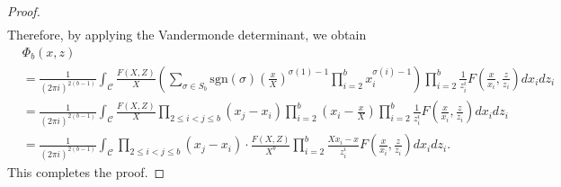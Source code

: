 \documentclass[12pt]{amsart}%
\theoremstyle{definition}
\begin{document}
\begin{proof}
\begin{align*}
\end{align*}
Therefore, by applying the Vandermonde determinant, we obtain
\begin{align*}
&\Phi_b(x,z)\\
&=\frac{1}{(2\pi i)^{2(b-1)}}\int_{\mathcal{C}}
\frac{F(X,Z)}{X}
\left(\sum_{\sigma\in S_b}\mathrm{sgn}(\sigma)\left(\frac{x}{X}\right)^{\sigma(1)-1}\prod^{b}_{i=2}
x_i^{\sigma(i)-1}\right)
\prod^{b}_{i=2}\frac{1}{z^i_i}
F\left(\frac{x}{x_i},\frac{z}{z_i}\right)dx_idz_i\\
&=\frac{1}{(2\pi i)^{2(b-1)}}\int_{\mathcal{C}}
\frac{F(X,Z)}{X}\prod_{2\le i<j\le b}(x_j-x_i)\prod^{b}_{i=2}\left(x_i-\frac{x}{X}\right)
\prod^{b}_{i=2}\frac{1}{z^i_i}
F\left(\frac{x}{x_i},\frac{z}{z_i}\right)dx_idz_i\\
&=\frac{1}{(2\pi i)^{2(b-1)}}\int_{\mathcal{C}}
\prod_{2\le i<j\le b}(x_j-x_i)\cdot 
\frac{F(X,Z)}{X^b}
\prod^{b}_{i=2}\frac{Xx_i-x}{z^i_i}
F\left(\frac{x}{x_i},\frac{z}{z_i}\right)dx_idz_i.
\end{align*}
This completes the proof.
\end{proof}







\end{document}

